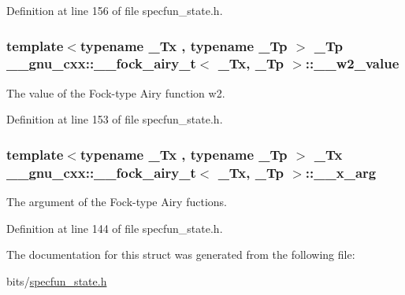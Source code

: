 Definition at line 156 of file specfun\+\_\+state.\+h.

\subsubsection[{\texorpdfstring{\+\_\+\+\_\+w2\+\_\+value}{__w2_value}}]{\setlength{\rightskip}{0pt plus 5cm}template$<$typename \+\_\+\+Tx , typename \+\_\+\+Tp $>$ \+\_\+\+Tp {\bf \+\_\+\+\_\+gnu\+\_\+cxx\+::\+\_\+\+\_\+fock\+\_\+airy\+\_\+t}$<$ \+\_\+\+Tx, \+\_\+\+Tp $>$\+::\+\_\+\+\_\+w2\+\_\+value}\hypertarget{struct____gnu__cxx_1_1____fock__airy__t_a305b6edec1ae08bcbc3b486720410283}{}\label{struct____gnu__cxx_1_1____fock__airy__t_a305b6edec1ae08bcbc3b486720410283}


The value of the Fock-\/type Airy function w2. 



Definition at line 153 of file specfun\+\_\+state.\+h.

\subsubsection[{\texorpdfstring{\+\_\+\+\_\+x\+\_\+arg}{__x_arg}}]{\setlength{\rightskip}{0pt plus 5cm}template$<$typename \+\_\+\+Tx , typename \+\_\+\+Tp $>$ \+\_\+\+Tx {\bf \+\_\+\+\_\+gnu\+\_\+cxx\+::\+\_\+\+\_\+fock\+\_\+airy\+\_\+t}$<$ \+\_\+\+Tx, \+\_\+\+Tp $>$\+::\+\_\+\+\_\+x\+\_\+arg}\hypertarget{struct____gnu__cxx_1_1____fock__airy__t_a383d76e48d9f70a90cab2cb8a2f1032d}{}\label{struct____gnu__cxx_1_1____fock__airy__t_a383d76e48d9f70a90cab2cb8a2f1032d}


The argument of the Fock-\/type Airy fuctions. 



Definition at line 144 of file specfun\+\_\+state.\+h.



The documentation for this struct was generated from the following file\+:\begin{DoxyCompactItemize}
\item 
bits/\hyperlink{specfun__state_8h}{specfun\+\_\+state.\+h}\end{DoxyCompactItemize}
